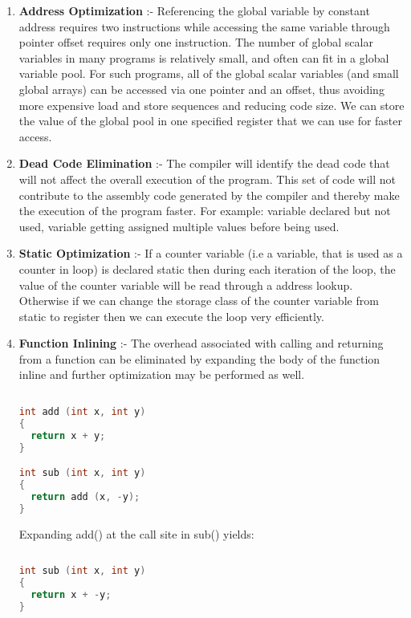 \documentclass{sigchi}
\begin{document}
\begin{enumerate}
\item {\bf Address Optimization} :-
Referencing the global variable by constant address requires two instructions while accessing the same variable through pointer offset requires only one instruction. The number of global scalar variables in many programs is relatively small, and often can fit in a global variable pool. For such programs, all of the global scalar variables (and small global arrays) can be accessed via one pointer and an offset, thus avoiding more expensive load and store sequences and reducing code size.
We can store the value of the global pool in one specified register that we can use for faster access.

\item {\bf Dead Code Elimination} :-
    The compiler will identify the dead code that will not affect the overall execution of the program. This set of code will not contribute to the assembly code generated by the compiler and thereby make the execution of the program faster.
For example:
variable declared but not used, 
variable getting assigned multiple values before being used.
\balance

\item {\bf Static Optimization} :-
    If  a counter variable (i.e a variable, that is used as a counter in loop) is declared static then during each iteration of the loop, the value of the counter variable will be read through a address lookup. Otherwise if we can change the storage class of the counter variable from static to register then we can execute the loop very efficiently.

\item {\bf Function Inlining} :-
	The overhead associated with calling and returning from a function can be eliminated by expanding the body of the function inline and further optimization may be performed as well.
\begin{lstlisting}[language=C++]
		 
int add (int x, int y)
{
  return x + y;
}

int sub (int x, int y)
{
  return add (x, -y);
}

\end{lstlisting}
Expanding add() at the call site in sub() yields:

\begin{lstlisting}[language=C++]
		 
int sub (int x, int y)
{
  return x + -y;
}

\end{lstlisting}
    
\end{enumerate}
\end{document}
